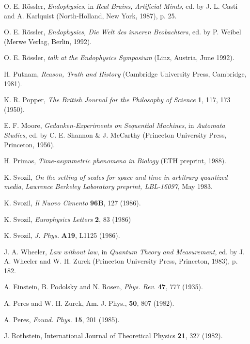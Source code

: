 \documentclass{article}
\begin{document}
\begin{thebibliography}{999}

 O. E. R\"ossler, {\sl Endophysics}, in {\sl Real Brains, Artificial
 Minds}, ed. by J. L. Casti and A. Karlquist (North-Holland, New
 York, 1987), p. 25.


 O. E. R\"ossler, {\sl Endophysics, Die Welt des inneren Beobachters},
 ed. by P. Weibel (Merwe Verlag, Berlin, 1992).

 O. E. R\"ossler, {\sl talk at the Endophysics Symposium} (Linz,
Austria, June 1992).

H. Putnam,
{\sl Reason, Truth and History}
(Cambridge University Press,
Cambridge, 1981).

 K. R. Popper, {\sl The British Journal for the Philosophy of Science}
 {\bf 1}, 117, 173 (1950).

 E. F. Moore, {\sl Gedanken-Experiments on Sequential Machines}, in
 {\sl Automata Studies}, ed. by C. E. Shannon \& J. McCarthy (Princeton
 University Press, Princeton, 1956).

 H. Primas, {\sl Time-asymmetric phenomena in Biology} (ETH preprint,
 1988).

 K. Svozil,
 {\sl On the setting of scales for space and time in arbitrary
 quantized media}, {\sl Lawrence Berkeley Laboratory preprint,
 LBL-16097,} May 1983.

K. Svozil,
 {\sl Il Nuovo Cimento} {\bf 96B}, 127 (1986).

K. Svozil,
{\sl Europhysics Letters} {\bf 2}, 83 (1986)

 K. Svozil,
{\sl J. Phys.} {\bf A19}, L1125 (1986).

 J. A. Wheeler, {\sl Law without law}, in {\sl
 Quantum Theory and Measurement}, ed. by J. A. Wheeler and W. H. Zurek
 (Princeton University Press, Princeton, 1983),
 p. 182.

 A. Einstein, B. Podolsky and N. Rosen, {\sl Phys. Rev.} {\bf 47}, 777
 (1935).

 A. Peres and W. H. Zurek, Am. J. Phys., {\bf 50}, 807 (1982).

 A. Peres, {\sl Found. Phys.} {\bf 15}, 201 (1985).

 J. Rothstein, International Journal of Theoretical Physics {\bf 21},
 327 (1982).


\end{thebibliography}
\end{document}
